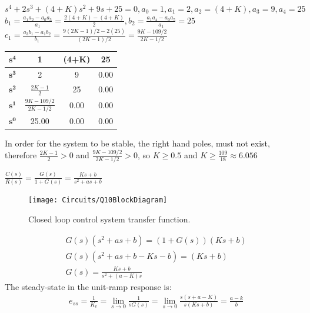 \documentclass[12pt]{article}
\newenvironment{problem}[2][Problem]{\begin{trivlist}
		\item[\hskip \labelsep {\bfseries #1}\hskip \labelsep {\bfseries #2.}]}{\end{trivlist}}
\begin{document}
\begin{problem}{9 --- B-5-21 --- Routh stability criterion} \hfill\newline
$s^4 + 2s^3 + (4 + K)s^2 + 9s + 25 = 0, a_0=1, a_1=2,a_2=(4+K),a_3=9,a_4=25$ \newline
$ \displaystyle b_1 =\frac{a_1a_2-a_0a_3}{a_1}= \frac{2(4+K)-(4+K)}{2}, b_2=\frac{a_1a_4-a_0a_5}{a_1}=25$  \newline $\displaystyle c_1 =\frac{a_3b_1-a_1b_2}{b_1}=\frac{9(2K-1)/2-2(25)}{(2K-1)/2}=\frac{9K-109/2}{2K-1/2}$
\begin{table}[H]
	\centering
		\renewcommand*{\arraystretch}{2}
\begin{tabular}{l c c c}
		\hline
		$\mathbf{s^4}$&1&(4+K)&25\\\hline
			$\mathbf{s^3}$&2&9&0.00\\\hline
		$\mathbf{s^2}$&$\frac{2K-1}{2}$&25&0.00\\\hline
			$\mathbf{s^1}$&$\frac{9K-109/2}{2K-1/2}$&0.00&0.00\\\hline
			$\mathbf{s^0}$&25.00&0.00&0.00\\\hline
	\end{tabular}
\end{table}
In order for the system to be stable, the right hand poles, must not exist, therefore $\frac{2K-1}{2} > 0$ and $\frac{9K-109/2}{2K-1/2}>0$, so $K \geq 0.5$ and $\displaystyle \boxed{ K \geq \frac{109}{18} \approx 6.056}$
\end{problem}
\begin{problem}{10 --- B-5-26 --- open loop transfer function-} \hfill\newline
	$\displaystyle \frac{C(s)}{R(s)}=\frac{G(s)}{1+G(s)}=\frac{Ks+b}{s^2+as+b}$
\begin{figure}[H]
	\centering
	\texttt{[image: Circuits/Q10BlockDiagram]}
	\caption{Closed loop control system transfer function.}
	\label{fig:q10blockdiagram}
\end{figure}
	\begin{align*}
		& G(s)(s^2+as+b)=(1+G(s))(Ks+b) \\
		& G(s)(s^2+as+b-Ks-b)=(Ks+b) \\
		& G(s)=\frac{Ks+b}{s^2+(a-K)s}
	\end{align*}
	The steady-state in the unit-ramp response is:
	\begin{align*}
		& e_{ss}=\frac{1}{K_v}	= \lim\limits_{s \rightarrow 0}\frac{1}{sG(s)}= \lim\limits_{s \rightarrow 0}\frac{s(s+a-K)}{s(Ks+b)}=\frac{a-k}{b}
	\end{align*}
\end{problem}
\end{document}
